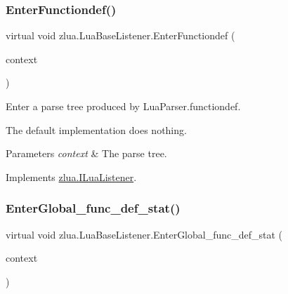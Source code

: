 \subsubsection{\texorpdfstring{Enter\+Functiondef()}{EnterFunctiondef()}}
{\footnotesize\ttfamily virtual void zlua.\+Lua\+Base\+Listener.\+Enter\+Functiondef (\begin{DoxyParamCaption}\item[{\mbox{[}\+Not\+Null\mbox{]} \mbox{\hyperlink{classzlua_1_1_lua_parser_1_1_functiondef_context}{Lua\+Parser.\+Functiondef\+Context}}}]{context }\end{DoxyParamCaption})\hspace{0.3cm}{\ttfamily [virtual]}}



Enter a parse tree produced by Lua\+Parser.\+functiondef. 

The default implementation does nothing.


\begin{DoxyParams}{Parameters}
{\em context} & The parse tree.\\
\hline
\end{DoxyParams}


Implements \mbox{\hyperlink{interfacezlua_1_1_i_lua_listener_af2184c75516162b18685ef6dce9e9047}{zlua.\+I\+Lua\+Listener}}.

\mbox{\label{classzlua_1_1_lua_base_listener_a26ccde71c2f917da169f16fa1dea9ecc}} 
\subsubsection{\texorpdfstring{Enter\+Global\+\_\+func\+\_\+def\+\_\+stat()}{EnterGlobal\_func\_def\_stat()}}
{\footnotesize\ttfamily virtual void zlua.\+Lua\+Base\+Listener.\+Enter\+Global\+\_\+func\+\_\+def\+\_\+stat (\begin{DoxyParamCaption}\item[{\mbox{[}\+Not\+Null\mbox{]} \mbox{\hyperlink{classzlua_1_1_lua_parser_1_1_global__func__def__stat_context}{Lua\+Parser.\+Global\+\_\+func\+\_\+def\+\_\+stat\+Context}}}]{context }\end{DoxyParamCaption})\hspace{0.3cm}{\ttfamily [virtual]}}



